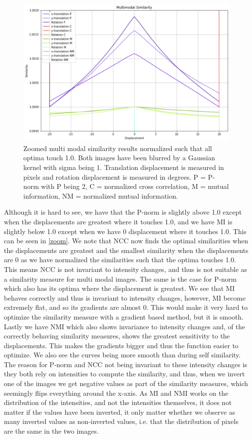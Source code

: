 \begin{figure}
	\centering
	\includegraphics[width=0.8\linewidth]{Materials/zoom}
	\caption{Zoomed multi modal similarity results normalized such that all optima touch 1.0. Both images have been blurred by a Gaussian kernel with sigma being 1. Translation displacement is measured in pixels and rotation displacement is measured in degrees. P = P-norm with P being 2, C = normalized cross correlation, M = mutual information, NM = normalized mutual information.}
	\label{zoom}
\end{figure}
Although it is hard to see, we have that the P-norm is slightly above 1.0 except when the displacements are greatest where it touches 1.0, and we have MI is slightly below 1.0 except when we have 0 displacement where it touches 1.0. This can be seen in \autoref{zoom}. We note that NCC now finds the optimal similarities when the displacements are greatest and the smallest similarity when the displacements are 0 as we have normalized the similarities such that the optima touches 1.0. This means NCC is not invariant to intensity changes, and thus is not suitable as a similarity measure for multi modal images. The same is the case for P-norm which also has its optima where the displacement is greatest. We see that  MI behaves correctly and thus is invariant to intensity changes, however, MI become extremely flat, and so its gradients are almost 0. This would make it very hard to optimize the similarity measure with a gradient based method, but it is smooth. Lastly we have NMI which also shows invariance to intensity changes and, of the correctly behaving similarity measures, shows the greatest sensitivity to the displacements. This makes the gradients bigger and thus the function easier to optimize. We also see the curves being more smooth than during self similarity.\\
The reason for P-norm and NCC not being invariant to these intensity changes is they both rely on intensities to compute the similarity, and thus, when we invert one of the images we get negative values as part of the similarity measures, which seemingly flips everything around the x-axis. As MI and NMI works on the distribution of the intensities, and not the intensities themselves, it does not matter if the values have been inverted, it only matter whether we observe as many inverted values as non-inverted values, i.e. that the distribution of pixels are the same in the two images.
